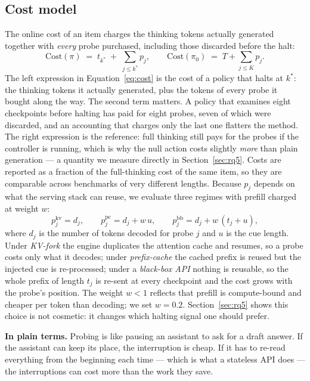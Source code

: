\documentclass[acmsmall]{acmart}
\newcommand{\intuit}[1]{\begin{intuition}\small\textbf{In plain terms.} #1\end{intuition}}
\theoremstyle{acmdefinition}%
\theoremstyle{acmplain}}{}%
\begin{document}
\subsection{Cost model}
The online cost of an item charges the thinking tokens actually generated together with \emph{every} probe purchased, including those discarded before the halt:
\begin{equation}
\mathrm{Cost}(\pi) \;=\; t_{k^\ast} \;+\; \sum_{j \leq k^\ast} p_j ,
\qquad
\mathrm{Cost}(\pi_0) \;=\; T + \sum_{j\leq K} p_j .
\label{eq:cost}
\end{equation}
The left expression in Equation~\eqref{eq:cost} is the cost of a policy that halts at $k^\ast$: the thinking tokens it actually generated, plus the tokens of every probe it bought along the way. The second term matters. A policy that examines eight checkpoints before halting has paid for eight probes, seven of which were discarded, and an accounting that charges only the last one flatters the method. The right expression is the reference: full thinking still pays for the probes if the controller is running, which is why the null action costs slightly \emph{more} than plain generation --- a quantity we measure directly in Section~\ref{sec:rq5}. Costs are reported as a fraction of the full-thinking cost of the same item, so they are comparable across benchmarks of very different lengths. Because $p_j$ depends on what the serving stack can reuse, we evaluate three regimes with prefill charged at weight $w$:
\begin{equation}
p_j^{\text{kv}} = d_j,\qquad
p_j^{\text{pc}} = d_j + w\,u,\qquad
p_j^{\text{bb}} = d_j + w\,(t_j + u),
\label{eq:regimes}
\end{equation}
where $d_j$ is the number of tokens decoded for probe $j$ and $u$ is the cue length. Under \emph{KV-fork} the engine duplicates the attention cache and resumes, so a probe costs only what it decodes; under \emph{prefix-cache} the cached prefix is reused but the injected cue is re-processed; under a \emph{black-box API} nothing is reusable, so the whole prefix of length $t_j$ is re-sent at every checkpoint and the cost grows with the probe's position. The weight $w<1$ reflects that prefill is compute-bound and cheaper per token than decoding; we set $w=0.2$. Section~\ref{sec:rq5} shows this choice is not cosmetic: it changes which halting signal one should prefer.

\intuit{Probing is like pausing an assistant to ask for a draft answer. If the assistant can keep its place, the interruption is cheap. If it has to re-read everything from the beginning each time --- which is what a stateless API does --- the interruptions can cost more than the work they save.}
\end{document}
